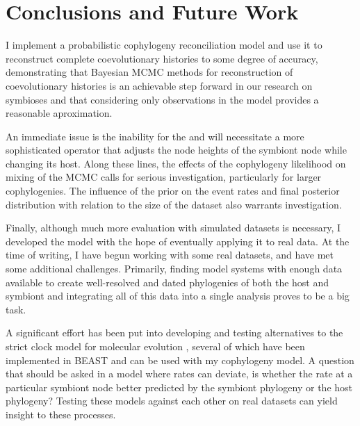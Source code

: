 \documentclass[12pt,letterpaper]{article}
\begin{document}
\section*{Conclusions and Future Work}

I implement a probabilistic cophylogeny reconciliation model and use it to reconstruct complete coevolutionary histories to some degree of accuracy, demonstrating that Bayesian \ac{MCMC} methods for reconstruction of coevolutionary histories is an achievable step forward in our research on symbioses and that considering only observations in the model provides a reasonable aproximation.

An immediate issue is the inability for the and will necessitate a more sophisticated operator that adjusts the node heights of the symbiont node while changing its host. Along these lines, the effects of the cophylogeny likelihood on mixing of the \ac{MCMC} calls for serious investigation, particularly for larger cophylogenies. The influence of the prior on the event rates and final posterior distribution with relation to the size of the dataset also warrants investigation.

Finally, although much more evaluation with simulated datasets is necessary, I developed the model with the hope of eventually applying it to real data. At the time of writing, I have begun working with some real datasets, and have met some additional challenges. Primarily, finding model systems with enough data available to create well-resolved and dated phylogenies of both the host and symbiont and integrating all of this data into a single analysis proves to be a big task.

A significant effort has been put into developing and testing alternatives to the strict clock model for molecular evolution \parencites{Drummond:2006}{Drummond:2010}{Baele:2012b}, several of which have been implemented in BEAST and can be used with my cophylogeny model. A question that should be asked in a model where rates can deviate, is whether the rate at a particular symbiont node better predicted by the symbiont phylogeny or the host phylogeny? Testing these models against each other on real datasets can yield insight to these processes.
\end{document}
